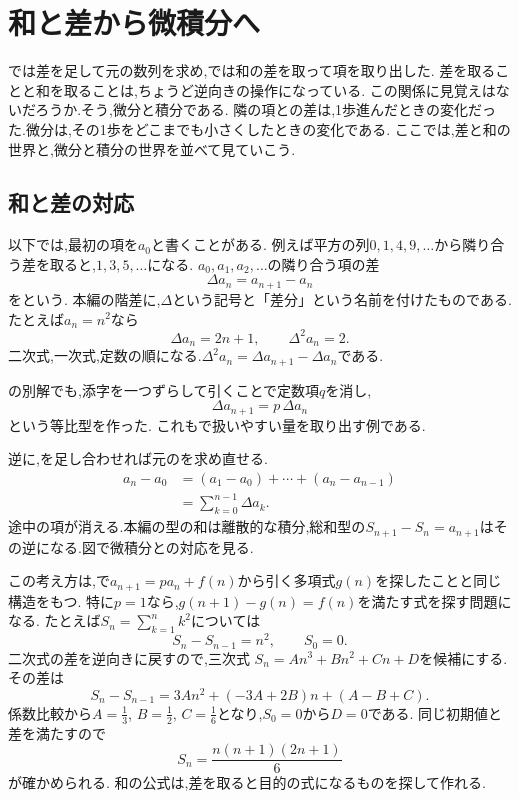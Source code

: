 ﻿%

\section{和と差から微積分へ}\label{節：和と差から微積分へ}

では差を足して元の数列を求め,では和の差を取って項を取り出した.
差を取ることと和を取ることは,ちょうど逆向きの操作になっている.
この関係に見覚えはないだろうか.そう,微分と積分である.
隣の項との差は,1歩進んだときの変化だった.微分は,その1歩をどこまでも小さくしたときの変化である.
ここでは,差と和の世界と,微分と積分の世界を並べて見ていこう.

\subsection{和と差の対応}
以下では,最初の項を$a_0$と書くことがある.
例えば平方の列$0,1,4,9,\ldots$から隣り合う差を取ると,$1,3,5,\ldots$になる.
$a_0,a_1,a_2,\ldots$の隣り合う項の差
\[
  \Delta a_n=a_{n+1}-a_n
\]
をという.
本編の階差に,$\Delta$という記号と「差分」という名前を付けたものである.
たとえば$a_n=n^2$なら
\[
  \Delta a_n=2n+1,\qquad \Delta^2a_n=2.
\]
二次式,一次式,定数の順になる.$\Delta^2a_n=\Delta a_{n+1}-\Delta a_n$である.

の別解でも,添字を一つずらして引くことで定数項$q$を消し,
\[
  \Delta a_{n+1}=p\,\Delta a_n
\]
という等比型を作った.
これもで扱いやすい量を取り出す例である.

逆に,を足し合わせれば元のを求め直せる.
\[
  \begin{aligned}
    a_n-a_0
    &=(a_1-a_0)+\cdots+(a_n-a_{n-1})\\
    &=\sum_{k=0}^{n-1}\Delta a_k.
  \end{aligned}
\]
途中の項が消える.本編の型の和は離散的な積分,総和型の$S_{n+1}-S_n=a_{n+1}$はその逆になる.図で微積分との対応を見る.
\BookFigDifference

この考え方は,で$a_{n+1}=pa_n+f(n)$から引く多項式$g(n)$を探したことと同じ構造をもつ.
特に$p=1$なら,$g(n+1)-g(n)=f(n)$を満たす式を探す問題になる.
たとえば$S_n=\sum_{k=1}^n k^2$については
\[
  S_n-S_{n-1}=n^2,\qquad S_0=0.
\]
二次式の差を逆向きに戻すので,三次式
$S_n=An^3+Bn^2+Cn+D$を候補にする.
その差は
\[
  S_n-S_{n-1}
  =3An^2+(-3A+2B)n+(A-B+C).
\]
係数比較から$A=\frac{1}{3}$, $B=\frac{1}{2}$, $C=\frac{1}{6}$となり,$S_0=0$から$D=0$である.
同じ初期値と差を満たすので
\[
  S_n=\frac{n(n+1)(2n+1)}6
\]
が確かめられる.
和の公式は,差を取ると目的の式になるものを探して作れる.

